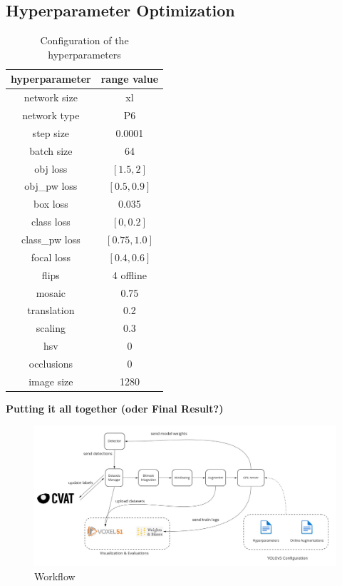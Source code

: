 \subsection*{Hyperparameter Optimization}
\begin{table}
  \centering
    \begin{tabular}{ ||c|c||}
    \hline
    hyperparameter  & range value\\ [0.5ex]
    \hline\hline
    network size & xl \\
    network type & P6 \\
    step size  & 0.0001 \\
    batch size & 64 \\
    obj loss & $[1.5, 2]$ \\
    obj\_pw loss & $[0.5, 0.9]$ \\
    box loss & 0.035  \\
    class loss & $[0, 0.2]$ \\
    class\_pw loss & $[0.75, 1.0]$ \\
    focal loss & $[0.4, 0.6]$ \\
    flips & 4 offline \\
    mosaic & 0.75 \\
    translation &  0.2 \\
    scaling & 0.3 \\
    hsv & 0 \\
    occlusions & 0 \\
    image size & 1280 \\
    \hline
    \end{tabular}
  \caption{Configuration of the hyperparameters}
  \label{impl:hyp_table}
\end{table}

\textbf{Putting it all together (oder Final Result?)} \\

\begin{figure}[!h]
  \centering
  \captionsetup{justification=centering,margin=2cm}
  \includegraphics[width=\columnwidth]{images/implementation/results/workflow}
  \caption{Workflow}
  \label{impl:workflow}
\end{figure}


